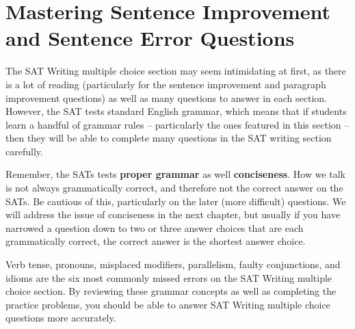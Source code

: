 \section{Mastering Sentence Improvement and Sentence Error Questions}

The SAT Writing multiple choice section may seem intimidating at first, as there is a lot of reading (particularly for the sentence improvement and paragraph improvement questions) as well as many questions to answer in each section. However, the SAT tests standard English grammar, which means that if students learn a handful of grammar rules -- particularly the ones featured in this section -- then they will be able to complete many questions in the SAT writing section carefully.

\bigskip
Remember, the SATs tests \textbf{proper grammar} as well \textbf{conciseness}. How we talk is not always grammatically correct, and therefore not the correct answer on the SATs. Be cautious of this, particularly on the later (more difficult) questions. We will address the issue of conciseness in the next chapter, but usually if you have narrowed a question down to two or three answer choices that are each grammatically correct, the correct answer is the shortest answer choice.

\bigskip
Verb tense, pronouns, misplaced modifiers, parallelism, faulty conjunctions, and idioms are the six most commonly missed errors on the SAT Writing multiple choice section. By reviewing these grammar concepts as well as completing the practice problems, you should be able to answer SAT Writing multiple choice questions more accurately.